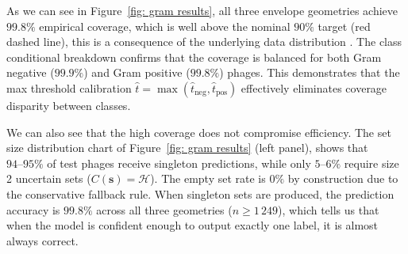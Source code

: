 As we can see in Figure~\ref{fig: gram results}, all three envelope geometries achieve $99.8\%$ empirical 
coverage, which is well above the nominal $90\%$ target (red dashed line), this is a consequence of the underlying data 
distribution . The class conditional breakdown 
confirms that the coverage is balanced for both Gram negative ($99.9\%$) and Gram positive ($99.8\%$) phages. This demonstrates 
that the max threshold calibration $\hat{t} = \max(\hat{t}_{\text{neg}}, \hat{t}_{\text{pos}})$ effectively eliminates coverage 
disparity between classes.

We can also see that the high coverage does not compromise efficiency. The set size distribution chart of Figure~\ref{fig: 
gram results} (left panel), shows that $94\text{--}95\%$ of test phages receive singleton predictions, while only $5\text
{--}6\%$ require size 2 uncertain sets ($C(\mathbf{s}) = \mathcal{H}$). The empty set rate is $0\%$ by construction due to the 
conservative fallback rule. When singleton sets are produced, the prediction accuracy is $99.8\%$ across all three geometries 
($n \ge 1\,249$), which tells us that when the model is confident enough to output exactly one label, it is almost always correct. 





